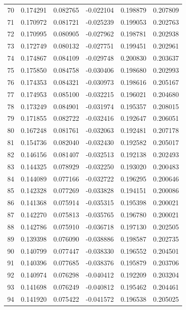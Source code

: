 \documentclass[a4paper, 12pt]{article}
\begin{document}
\begin{tabularx}{\linewidth}{|X|X|X|X|X|X|}
    70 & 0.174291 & 0.082765 & -0.022104 & 0.198879 & 0.207809 \\
    71 & 0.170972 & 0.081721 & -0.025239 & 0.199053 & 0.202763 \\
    72 & 0.170995 & 0.080905 & -0.027962 & 0.198781 & 0.202938 \\
    73 & 0.172749 & 0.080132 & -0.027751 & 0.199451 & 0.202961 \\
    74 & 0.174867 & 0.084109 & -0.029748 & 0.200830 & 0.203637 \\
    75 & 0.175850 & 0.084758 & -0.030406 & 0.198680 & 0.202993 \\
    76 & 0.174353 & 0.084321 & -0.030973 & 0.198616 & 0.205167 \\
    77 & 0.174953 & 0.085100 & -0.032215 & 0.196021 & 0.204680 \\
    78 & 0.173249 & 0.084901 & -0.031974 & 0.195357 & 0.208015 \\
    79 & 0.171855 & 0.082722 & -0.032416 & 0.192647 & 0.206051 \\
    80 & 0.167248 & 0.081761 & -0.032063 & 0.192481 & 0.207178 \\
    81 & 0.154736 & 0.082040 & -0.032430 & 0.192582 & 0.205017 \\
    82 & 0.146156 & 0.081407 & -0.032513 & 0.192138 & 0.202493 \\
    83 & 0.144325 & 0.078929 & -0.032250 & 0.193020 & 0.200483 \\
    84 & 0.144089 & 0.077166 & -0.032722 & 0.196295 & 0.200646 \\
    85 & 0.142328 & 0.077269 & -0.033828 & 0.194151 & 0.200086 \\
    86 & 0.141368 & 0.075914 & -0.035315 & 0.195398 & 0.200021 \\
    87 & 0.142270 & 0.075813 & -0.035765 & 0.196780 & 0.200021 \\
    88 & 0.142786 & 0.075910 & -0.036718 & 0.197130 & 0.202505 \\
    89 & 0.139398 & 0.076090 & -0.038886 & 0.198587 & 0.202735 \\
    90 & 0.140799 & 0.077447 & -0.038330 & 0.196552 & 0.204501 \\
    91 & 0.140396 & 0.077685 & -0.038376 & 0.195879 & 0.203706 \\
    92 & 0.140974 & 0.076298 & -0.040412 & 0.192209 & 0.203204 \\
    93 & 0.141698 & 0.076249 & -0.040812 & 0.195462 & 0.204461 \\
    94 & 0.141920 & 0.075422 & -0.041572 & 0.196538 & 0.205025 \\

\end{tabularx}
\end{document}

